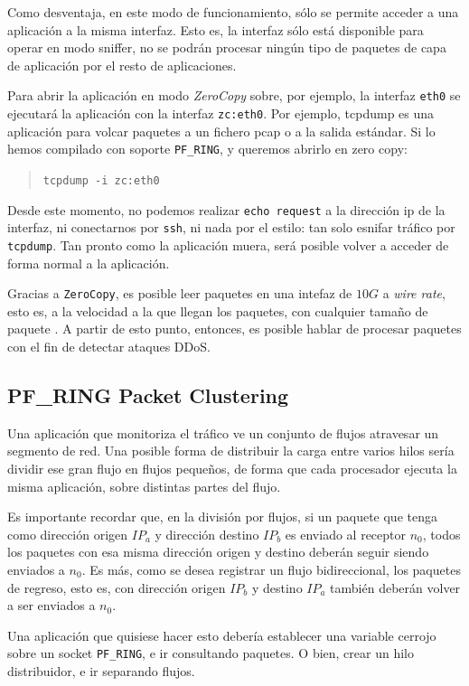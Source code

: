 Como desventaja, en este modo de funcionamiento, sólo se permite acceder a una aplicación a la misma interfaz. Esto es, 
la interfaz sólo está disponible para operar en modo sniffer, no se podrán procesar ningún tipo de paquetes de capa de 
aplicación por el resto de aplicaciones.

Para abrir la aplicación en modo \emph{ZeroCopy} sobre, por ejemplo, la interfaz \texttt{eth0} se ejecutará la 
aplicación con la interfaz \texttt{zc:eth0}. Por ejemplo, tcpdump es una aplicación para volcar paquetes a un fichero 
pcap o a la salida estándar. Si lo hemos compilado con soporte \texttt{PF\_RING}, y queremos abrirlo en zero copy:
\begin{quote}
 \texttt{tcpdump -i zc:eth0}
\end{quote}
Desde este momento, no podemos realizar \texttt{echo request} a la dirección ip de la interfaz, ni conectarnos por 
\texttt{\gls{ssh}}, ni nada por el estilo: tan solo esnifar tráfico por \texttt{tcpdump}. Tan pronto como la aplicación 
muera, será posible volver a acceder de forma normal a la aplicación.

Gracias a \texttt{ZeroCopy}, es posible leer paquetes en una intefaz de $10G$ a \emph{wire rate}, esto es, a la 
velocidad a la que llegan los paquetes, con cualquier tamaño de paquete \cite{PFRingZc}. A partir de esto punto, 
entonces, es posible hablar de procesar paquetes con el fin de detectar ataques \gls{DDoS}.


\subsection{PF\_RING Packet Clustering}
Una aplicación que monitoriza el tráfico ve un conjunto de flujos atravesar un segmento de red. Una posible forma de 
distribuir la carga entre varios hilos sería dividir ese gran flujo en flujos pequeños, de forma que cada procesador 
ejecuta la misma aplicación, sobre distintas partes del flujo.

Es importante recordar que, en la división por flujos, si un paquete que tenga como dirección origen $IP_a$ y dirección 
destino $IP_b$ es enviado al receptor $n_0$, todos los paquetes con esa misma dirección origen y destino deberán seguir 
siendo enviados a $n_0$. Es más, como se desea registrar un flujo bidireccional, los paquetes de regreso, esto es, con 
dirección origen $IP_b$ y destino $IP_a$ también deberán volver a ser enviados a $n_0$.

Una aplicación que quisiese hacer esto debería establecer una variable cerrojo sobre un socket \texttt{PF\_RING}, e ir 
consultando paquetes. O bien, crear un hilo distribuidor, e ir separando flujos.

